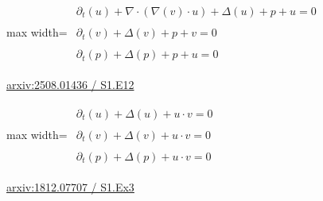 \documentclass[10pt,a4paper]{article}
\begin{document}
\begin{minipage}{\linewidth}
\begin{center}\begin{adjustbox}{max width=\linewidth}$\displaystyle\begin{gathered}\begin{gathered}\partial_{t}(u)+\nabla\cdot(\nabla(v)\cdot u)+\Delta(u)+p+u=0\end{gathered}\\[5pt]\begin{gathered}\partial_{t}(v)+\Delta(v)+p+v=0\end{gathered}\\[5pt]\begin{gathered}\partial_{t}(p)+\Delta(p)+p+u=0\end{gathered}\end{gathered}$\end{adjustbox}\end{center}
{\small \href{https://arxiv.org/html/2508.01436#S1.E12}{arxiv:2508.01436 / S1.E12}}\par
\end{minipage}\par\vspace{7mm}

\begin{minipage}{\linewidth}
\begin{center}\begin{adjustbox}{max width=\linewidth}$\displaystyle\begin{gathered}\begin{gathered}\partial_{t}(u)+\Delta(u)+u\cdot v=0\end{gathered}\\[5pt]\begin{gathered}\partial_{t}(v)+\Delta(v)+u\cdot v=0\end{gathered}\\[5pt]\begin{gathered}\partial_{t}(p)+\Delta(p)+u\cdot v=0\end{gathered}\end{gathered}$\end{adjustbox}\end{center}
{\small \href{https://arxiv.org/html/1812.07707#S1.Ex3}{arxiv:1812.07707 / S1.Ex3}}\par
\end{minipage}\par\vspace{7mm}
\end{document}
